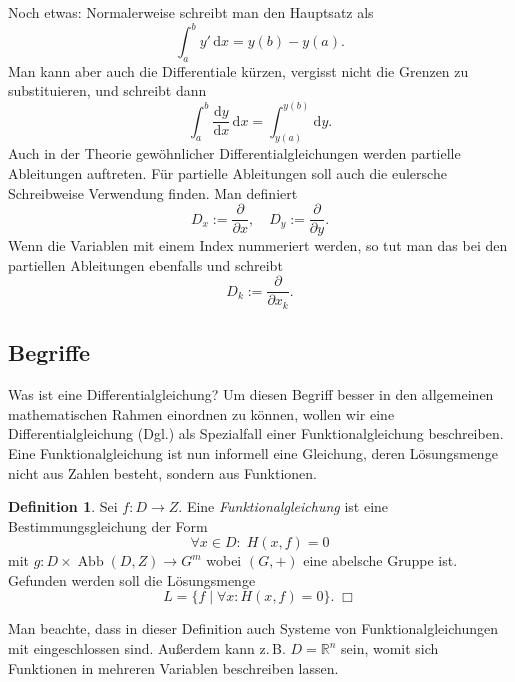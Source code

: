 \documentclass[a4paper,10pt,fleqn,twocolumn,twoside,openany]{scrartcl}
\numberwithin{equation}{section}
\newcommand{\R}{\mathbb R}
\theoremstyle{definition}
\newtheorem{Definition}{Definition}
\begin{document}
Noch etwas: Normalerweise schreibt man den Hauptsatz als
\begin{equation}
\int_a^b y'\,\mathrm dx = y(b)-y(a).
\end{equation}
Man kann aber auch die Differentiale {\glqq}kürzen{\grqq},
vergisst nicht die Grenzen zu substituieren, und schreibt dann
\begin{equation}
\int_a^b \frac{\mathrm dy}{\mathrm dx}\,\mathrm dx
= \int_{y(a)}^{y(b)}\mathrm dy.
\end{equation}
Auch in der Theorie gewöhnlicher Differentialgleichungen werden
partielle Ableitungen auftreten. Für partielle Ableitungen soll
auch die eulersche Schreibweise Verwendung finden. Man definiert
\begin{equation}
D_x := \frac{\partial}{\partial x},\quad
D_y := \frac{\partial}{\partial y}.
\end{equation}
Wenn die Variablen mit einem Index nummeriert werden, so
tut man das bei den partiellen Ableitungen ebenfalls und schreibt
\begin{equation}
D_k := \frac{\partial}{\partial x_k}.
\end{equation}

\subsection{Begriffe}
Was ist eine Differentialgleichung? Um diesen Begriff besser in den
allgemeinen mathematischen Rahmen einordnen zu können, wollen wir eine
Differentialgleichung (Dgl.) als Spezialfall einer Funktionalgleichung
beschreiben. Eine Funktionalgleichung ist nun informell eine Gleichung,
deren Lösungsmenge nicht aus Zahlen besteht, sondern aus Funktionen.

\begin{Definition}
Sei $f\colon D\to Z$. Eine \emph{Funktionalgleichung} ist
eine Bestimmungsgleichung der Form
\begin{equation}\label{eq:Funktionalgleichung}
\forall x{\in}D\colon\;H(x,f)=0
\end{equation}
mit $g\colon D\times\operatorname{Abb}(D,Z)\to G^m$ wobei $(G,+)$
eine abelsche Gruppe ist. Gefunden werden soll die
Lösungsmenge%
\begin{equation}
L = \{f\mid\forall x\colon H(x,f)=0\}.\;\Box
\end{equation}
\end{Definition}
\noindent
Man beachte, dass in dieser Definition auch Systeme
von Funktionalgleichungen
mit eingeschlossen sind. Außerdem kann z.\,B. $D=\R^n$ sein, womit
sich Funktionen in mehreren Variablen beschreiben lassen.
\end{document}
